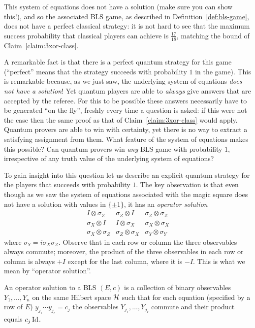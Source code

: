 This system of equations does not have a solution (make sure you can show this!), and so the associated  BLS game, as described in Definition~\ref{def:bls-game}, does not have a perfect classical strategy: it is not hard to see that the maximum success probability that classical players can achieve is $\frac{17}{18}$, matching the bound of Claim~\ref{claim:3xor-class}. 

A remarkable fact is that there is a perfect quantum strategy for this game (``perfect'' means that the strategy succeeds with probability $1$ in the game).  This is remarkable because, as we just saw, the underlying system of equations \emph{does not have a solution}! Yet quantum players are able to \emph{always} give answers that are accepted by the referee. For this to be possible these answers necessarily have to be generated ``on the fly'', freshly every time a question is asked: if this were not the case then the same proof as that of Claim~\ref{claim:3xor-class} would apply. Quantum provers are able to win with certainty, yet there is no way to extract a satisfying assignment from them. What feature of the system of equations makes this possible? Can quantum provers win \emph{any} BLS game with probability $1$, irrespective of any truth value of the underlying system of equations? 

To gain insight into this question let us describe an explicit quantum strategy for the players that succeeds with probability $1$. The key observation is that even though as we saw the system of equations associated with the magic square does not have a solution with values in $\{\pm 1\}$, it has an \emph{operator solution}
\begin{equation}\label{eq:opsol-ms}
 \begin{matrix} I\otimes \sigma_Z & \sigma_Z \otimes I & \sigma_Z \otimes \sigma_Z \\
\sigma_X \otimes I & I \otimes \sigma_X & \sigma_X\otimes \sigma_X\\
\sigma_X \otimes \sigma_Z & \sigma_Z \otimes \sigma_X & \sigma_Y \otimes \sigma_Y 
\end{matrix}
\end{equation}
where $\sigma_Y = i\sigma_X\sigma_Z$. 
Observe that in each row or column the three observables always commute; moreover, the product of the three observables in each row or column is always $+I$ except for the last column, where it is $-I$. This is what we mean by ``operator solution''.

\begin{definition}
An operator solution to a BLS $(E,c)$ is a collection of binary observables $Y_1,\ldots,Y_n$ on the same Hilbert space $\mathcal{H}$ such that for each equation (specified by a row of $E$) $y_{j_1}\cdots y_{j_\ell} = c_j$ the observables $Y_{j_1},\ldots,Y_{j_\ell}$ commute and their product equals $c_j \mathop{\rm Id}\nolimits$. 
\end{definition}

